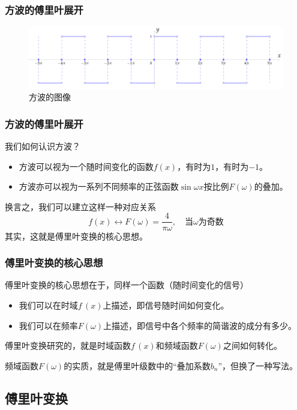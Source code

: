 \begin{frame}
    \frametitle{方波的傅里叶展开}
    \begin{figure}
        \includegraphics[width=14cm]{image/RecWave.pdf}
        \caption{方波的图像}
    \end{figure}
\end{frame}

\begin{frame}
    \frametitle{方波的傅里叶展开}
    我们如何认识方波？
    \begin{itemize}
        \item 方波可以视为一个随时间变化的函数$f(x)$，有时为$1$，有时为$-1$。
        \item 方波亦可以视为一系列不同频率的正弦函数$\sin\omega x$按比例$F(\omega)$的叠加。
    \end{itemize}

    换言之，我们可以建立这样一种对应关系
    \begin{equation}
        f(x)\leftrightarrow F(\omega)=\frac{4}{\pi\omega},\quad\text{当$\omega$为奇数}
    \end{equation}
    其实，这就是傅里叶变换的核心思想。
\end{frame}

\begin{frame}
    \frametitle{傅里叶变换的核心思想}
    傅里叶变换的核心思想在于，同样一个函数（随时间变化的信号）
    \begin{itemize}
        \item 我们可以在时域$f\,(x)$上描述，即信号随时间如何变化。
        \item 我们可以在频率$F(\omega)$上描述，即信号中各个频率的简谐波的成分有多少。
    \end{itemize}
    傅里叶变换研究的，就是时域函数$f\,(x)$和频域函数$F(\omega)$之间如何转化。

    频域函数$F(\omega)$的实质，就是傅里叶级数中的“叠加系数$b_n$”，但换了一种写法。
\end{frame}

\subsection{傅里叶变换}

